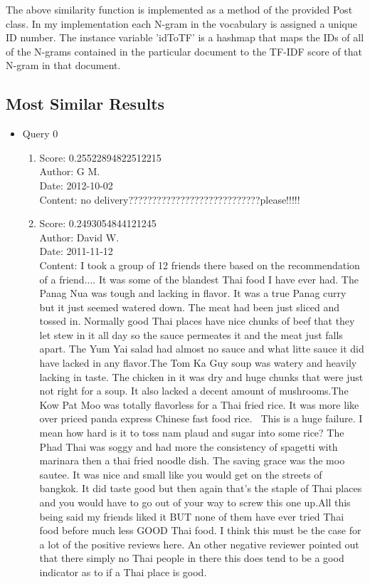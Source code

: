\documentclass[paper=a4, fontsize=11pt]{jhwhw} %
\begin{document}
The above similarity function is implemented as a method of the provided Post class. In my implementation each N-gram in the vocabulary is assigned a unique ID number. The instance variable 'idToTF' is a hashmap that maps the IDs of all of the N-grams contained in the particular document to the TF-IDF score of that N-gram in that document. 

\subsection{Most Similar Results}
\begin{itemize}
    \item Query 0
        \begin{enumerate}
            \item Score: 0.25522894822512215\\
                Author: G M.\\
                Date: 2012-10-02\\
                Content: no delivery????????????????????????????please!!!!!
            \item Score: 0.2493054844121245\\
                Author: David W.\\
                Date: 2011-11-12\\
                Content: I took a group of 12 friends there based on the recommendation of a friend.... It was some of the blandest Thai food I have ever had. The Panag Nua was tough and lacking in flavor. It was a true Panag curry but it just seemed watered down. The meat had been just sliced and tossed in. Normally good Thai places have nice chunks of beef that they let stew in it all day so the sauce permeates it and the meat just falls apart. The Yum Yai salad had almost no sauce and what litte sauce it did have lacked in any flavor.The Tom Ka Guy soup was watery and heavily lacking in taste. The chicken in it was dry and huge chunks that were just not right for a soup. It also lacked a decent amount of mushrooms.The Kow Pat Moo was totally flavorless for a Thai fried rice. It was more like over priced panda express Chinese fast food rice.  This is a huge failure. I mean how hard is it to toss nam plaud and sugar into some rice? The Phad Thai was soggy and had more the consistency of spagetti with marinara then a thai fried noodle dish. The saving grace was the moo sautee. It was nice and small like you would get on the streets of bangkok. It did taste good but then again that's the staple of Thai places and you would have to go out of your way to screw this one up.All this being said my friends liked it BUT none of them have ever tried Thai food before much less GOOD Thai food. I think this must be the case for a lot of the positive reviews here. An other negative reviewer pointed out that there simply no Thai people in there this does tend to be a good indicator as to if a Thai place is good.

\end{enumerate}
\end{itemize}
\end{document}
